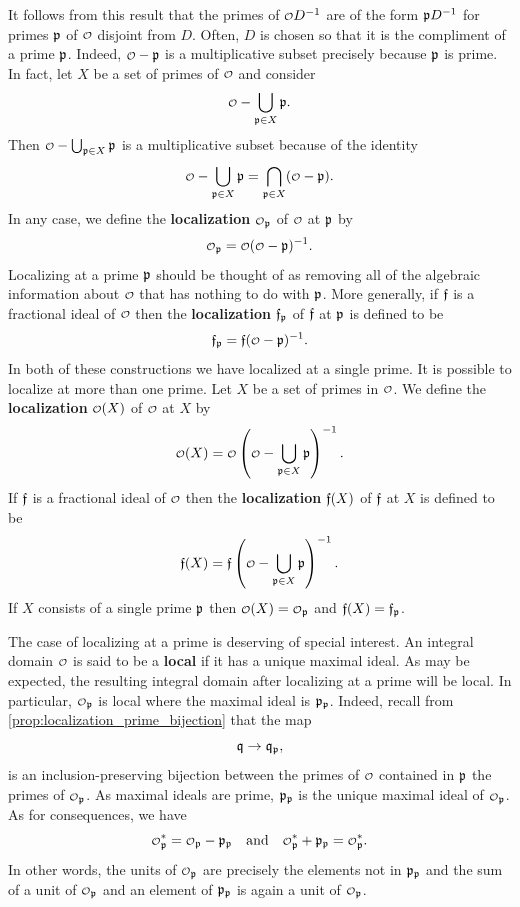     It follows from this result that the primes of \(\smc{O}D^{-1}\) are of the form \(\mathfrak{p}D^{-1}\) for primes \(\mathfrak{p}\) of \(\smc{O}\) disjoint from \(D\). Often, \(D\) is chosen so that it is the compliment of a prime \(\mathfrak{p}\). Indeed, \(\smc{O}-\mf{p}\) is a multiplicative subset precisely because \(\mathfrak{p}\) is prime. In fact, let \(X\) be a set of primes of \(\smc{O}\) and consider
    \[
      \smc{O}-\bigcup_{\mf{p} \in X}\mf{p}.
    \]
    Then \(\smc{O}-\bigcup_{\mf{p} \in X}\mf{p}\) is a multiplicative subset because of the identity
    \[
      \smc{O}-\bigcup_{\mf{p} \in X}\mf{p} = \bigcap_{\mf{p} \in X}(\smc{O}-\mf{p}).
    \]
    In any case, we define the \textbf{localization} \(\smc{O}_{\mf{p}}\) of \(\smc{O}\) at \(\mathfrak{p}\) by
    \[
      \smc{O}_{\mf{p}} = \smc{O}(\smc{O}-\mf{p})^{-1}.
    \]
    Localizing at a prime \(\mathfrak{p}\) should be thought of as removing all of the algebraic information about \(\smc{O}\) that has nothing to do with \(\mathfrak{p}\). More generally, if \(\mathfrak{f}\) is a fractional ideal of \(\smc{O}\) then the \textbf{localization} \(\mathfrak{f}_{\mathfrak{p}}\) of \(\mathfrak{f}\) at \(\mathfrak{p}\) is defined to be
    \[
      \mf{f}_{\mf{p}} = \mf{f}(\smc{O}-\mf{p})^{-1}.
    \]
    In both of these constructions we have localized at a single prime. It is possible to localize at more than one prime. Let \(X\) be a set of primes in \(\smc{O}\). We define the \textbf{localization} \(\smc{O}(X)\) of \(\smc{O}\) at \(X\) by
    \[
      \smc{O}(X) = \smc{O}\left(\smc{O}-\bigcup_{\mf{p} \in X}\mf{p}\right)^{-1}.
    \]
    If \(\mathfrak{f}\) is a fractional ideal of \(\smc{O}\) then the \textbf{localization} \(\mathfrak{f}(X)\) of \(\mathfrak{f}\) at \(X\) is defined to be
    \[
      \mf{f}(X) = \mf{f}\left(\smc{O}-\bigcup_{\mf{p} \in X}\mf{p}\right)^{-1}.
    \]
    If \(X\) consists of a single prime \(\mathfrak{p}\) then \(\smc{O}(X) = \smc{O}_{\mf{p}}\) and \(\mathfrak{f}(X) = \mathfrak{f}_{\mathfrak{p}}\).

    The case of localizing at a prime is deserving of special interest. An integral domain \(\smc{O}\) is said to be a \textbf{local} if it has a unique maximal ideal. As may be expected, the resulting integral domain after localizing at a prime will be local. In particular, \(\smc{O}_{\mf{p}}\) is local where the maximal ideal is \(\mathfrak{p}_{\mathfrak{p}}\). Indeed, recall from \cref{prop:localization_prime_bijection} that the map
    \[
      \mathfrak{q} \to \mathfrak{q}_{\mathfrak{p}},
    \]
    is an inclusion-preserving bijection between the primes of \(\smc{O}\) contained in \(\mathfrak{p}\) the primes of \(\smc{O}_{\mf{p}}\). As maximal ideals are prime, \(\mathfrak{p}_{\mathfrak{p}}\) is the unique maximal ideal of \(\smc{O}_{\mf{p}}\). As for consequences, we have
    \[
      \smc{O}_{\mf{p}}^{\ast} = \smc{O}_{\mf{p}}-\mf{p}_{\mf{p}} \quad \text{and} \quad \smc{O}_{\mf{p}}^{\ast}+\mf{p}_{\mf{p}} = \smc{O}_{\mf{p}}^{\ast}.
    \]
    In other words, the units of \(\smc{O}_{\mf{p}}\) are precisely the elements not in \(\mathfrak{p}_{\mathfrak{p}}\) and the sum of a unit of \(\smc{O}_{\mf{p}}\) and an element of \(\mathfrak{p}_{\mathfrak{p}}\) is again a unit of \(\smc{O}_{\mf{p}}\).

